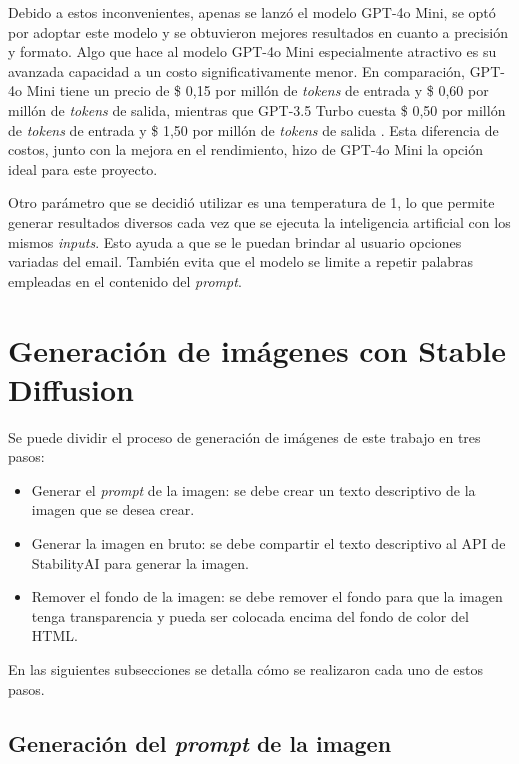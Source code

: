 Debido a estos inconvenientes, apenas se lanzó el modelo GPT-4o Mini, se optó por adoptar este modelo y se obtuvieron mejores resultados en cuanto a precisión y formato. Algo que hace al modelo GPT-4o Mini especialmente atractivo es su avanzada capacidad a un costo significativamente menor. En comparación, GPT-4o Mini tiene un precio de \$ 0,15 por millón de \textit{tokens} de entrada y \$ 0,60 por millón de \textit{tokens} de salida, mientras que GPT-3.5 Turbo cuesta \$ 0,50 por millón de \textit{tokens} de entrada y \$ 1,50 por millón de \textit{tokens} de salida \cite{OpenAI2024Pricing}. Esta diferencia de costos, junto con la mejora en el rendimiento, hizo de GPT-4o Mini la opción ideal para este proyecto.

Otro parámetro que se decidió utilizar es una temperatura de 1, lo que permite generar resultados diversos cada vez que se ejecuta la inteligencia artificial con los mismos \textit{inputs}. Esto ayuda a que se le puedan brindar al usuario opciones variadas del email. También evita que el modelo se limite a repetir palabras empleadas en el contenido del \textit{prompt}.


\section{Generación de imágenes con Stable Diffusion}
\label{sec:GeneracionImg}

Se puede dividir el proceso de generación de imágenes de este trabajo en tres pasos:
\begin{itemize}
    \item Generar el \textit{prompt} de la imagen: se debe crear un texto descriptivo de la imagen que se desea crear.
    \item Generar la imagen en bruto: se debe compartir el texto descriptivo al API de StabilityAI para generar la imagen.
    \item Remover el fondo de la imagen: se debe remover el fondo para que la imagen tenga transparencia y pueda ser colocada encima del fondo de color del HTML.
\end{itemize}

En las siguientes subsecciones se detalla cómo se realizaron cada uno de estos pasos.
\pagebreak
\subsection{Generación del \textit{prompt} de la imagen}


